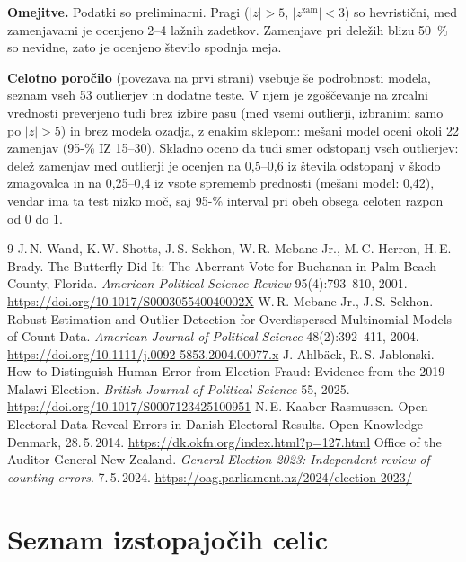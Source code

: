\documentclass[11pt,a4paper]{article}
\begin{document}
\textbf{Omejitve.} Podatki so preliminarni. Pragi ($|z|>5$, $|z^{\text{zam}}|<3$) so hevristični, med zamenjavami je ocenjeno 2--4 lažnih zadetkov. Zamenjave pri deležih blizu 50~\% so nevidne, zato je ocenjeno število spodnja meja.

\textbf{Celotno poročilo} (povezava na prvi strani) vsebuje še podrobnosti modela, seznam vseh 53 outlierjev in dodatne teste. V njem je zgoščevanje na zrcalni vrednosti preverjeno tudi brez izbire pasu (med vsemi outlierji, izbranimi samo po $|z|>5$) in brez modela ozadja, z enakim sklepom: mešani model oceni okoli 22 zamenjav (95-\% IZ 15--30). Skladno oceno da tudi smer odstopanj vseh outlierjev: delež zamenjav med outlierji je ocenjen na 0,5--0,6 iz števila odstopanj v škodo zmagovalca in na 0,25--0,4 iz vsote sprememb prednosti (mešani model: 0,42), vendar ima ta test nizko moč, saj 95-\% interval pri obeh obsega celoten razpon od 0 do 1.

\vspace*{0pt plus 1filll}
\begin{thebibliography}{9}
 J.\,N. Wand, K.\,W. Shotts, J.\,S. Sekhon, W.\,R. Mebane Jr., M.\,C. Herron, H.\,E. Brady. The Butterfly Did It: The Aberrant Vote for Buchanan in Palm Beach County, Florida. \emph{American Political Science Review} 95(4):793--810, 2001. \url{https://doi.org/10.1017/S000305540040002X}
 W.\,R. Mebane Jr., J.\,S. Sekhon. Robust Estimation and Outlier Detection for Overdispersed Multinomial Models of Count Data. \emph{American Journal of Political Science} 48(2):392--411, 2004. \url{https://doi.org/10.1111/j.0092-5853.2004.00077.x}
 J. Ahlbäck, R.\,S. Jablonski. How to Distinguish Human Error from Election Fraud: Evidence from the 2019 Malawi Election. \emph{British Journal of Political Science} 55, 2025. \url{https://doi.org/10.1017/S0007123425100951}
 N.\,E. Kaaber Rasmussen. Open Electoral Data Reveal Errors in Danish Electoral Results. Open Knowledge Denmark, 28.\,5.\,2014. \url{https://dk.okfn.org/index.html?p=127.html}
 Office of the Auditor-General New Zealand. \emph{General Election 2023: Independent review of counting errors}. 7.\,5.\,2024. \url{https://oag.parliament.nz/2024/election-2023/}
\end{thebibliography}

\clearpage
\appendix
\section{Seznam izstopajočih celic}
\end{document}
